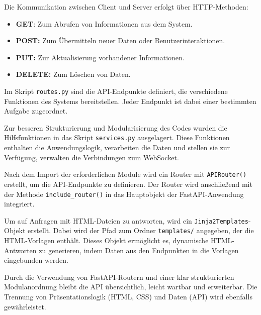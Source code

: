 \documentclass[12pt, letterpaper]{article}
\begin{document}
  
  \par Die Kommunikation zwischen Client und Server erfolgt über HTTP-Methoden:
  \begin{itemize}
    \item \textbf{GET}: Zum Abrufen von Informationen aus dem System.
    \item \textbf{POST:} Zum Übermitteln neuer Daten oder Benutzerinteraktionen.
    \item \textbf{PUT:} Zur Aktualisierung vorhandener Informationen. 
    \item \textbf{DELETE:} Zum Löschen von Daten.
  \end{itemize} 
  \par Im Skript \texttt{routes.py} sind die API-Endpunkte definiert, die verschiedene Funktionen des Systems bereitstellen. Jeder Endpunkt ist dabei einer bestimmten Aufgabe zugeordnet. 
  \par Zur besseren Strukturierung und Modularisierung des Codes wurden die Hilfsfunktionen in das Skript \texttt{services.py} ausgelagert. Diese Funktionen enthalten die Anwendungslogik, verarbeiten die Daten und stellen sie zur Verfügung, verwalten die Verbindungen zum WebSocket.
  \par Nach dem Import der erforderlichen Module wird ein Router mit \texttt{APIRouter()} erstellt, um die API-Endpunkte zu definieren. Der Router wird anschließend mit der Methode \texttt{include\_router()} in das Hauptobjekt der FastAPI-Anwendung integriert.
  \par Um auf Anfragen mit HTML-Dateien zu antworten, wird ein \texttt{Jinja2Templates}-Objekt erstellt. Dabei wird der Pfad zum Ordner \texttt{templates/} angegeben, der die HTML-Vorlagen enthält. Dieses Objekt ermöglicht es, dynamische HTML-Antworten zu generieren, indem Daten aus den Endpunkten in die Vorlagen eingebunden werden.
  \par Durch die Verwendung von FastAPI-Routern und einer klar strukturierten Modulanordnung bleibt die API übersichtlich, leicht wartbar und erweiterbar. Die Trennung von Präsentationslogik (HTML, CSS) und Daten (API) wird ebenfalls gewährleistet.
\end{document}
